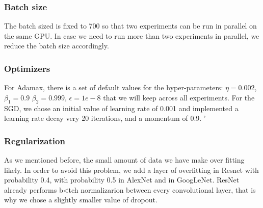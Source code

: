 \subsubsection{Batch size}
The batch sized is fixed to 700 so that two experiments can be run in parallel on the same GPU. In case we need to run more than two experiments in parallel, we reduce the batch size accordingly.

\subsubsection{Optimizers}
For Adamax, there is a set of default values for the hyper-parameters: \(\eta = 0.002\), \(\beta_1 = 0.9\) \(\beta_2 = 0.999\), \(\epsilon = 1e-8\) that we will keep across all experiments.
For the SGD, we chose an initial value of learning rate of 0.001 and implemented a learning rate decay very 20 iterations, and a momentum of 0.9. '

\subsubsection{Regularization}
As we mentioned before, the small amount of data we have make over fitting likely. In order to avoid this problem, we add a layer of overfitting in Resnet with probability 0.4, with probability 0.5 in AlexNet and in GoogLeNet. ResNet already performs b<tch normalizarion between every convolutional layer, that is why we chose a slightly smaller value of dropout. 